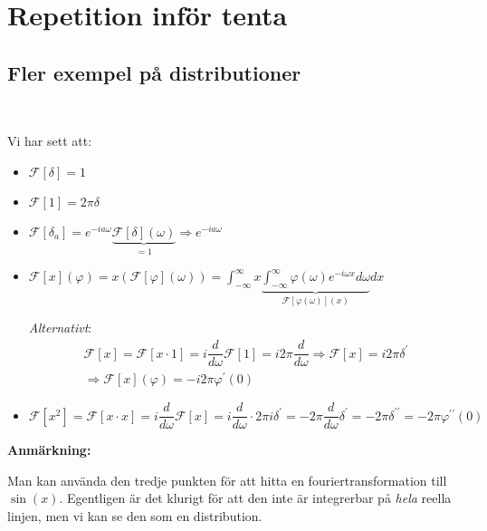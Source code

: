 \section{Repetition inför tenta}
\par\bigskip
\subsection{Fler exempel på distributioner}\hfill\\\par
\noindent Vi har sett att:\par
\begin{itemize}
  \item $\mathcal{F}\left[\delta\right] = 1$
  \item $\mathcal{F}\left[1\right] = 2\pi\delta$
  \item $\mathcal{F}\left[\delta_a\right] = e^{-ia\omega}\underbrace{\mathcal{F}\left[\delta\right](\omega)}_{\text{$=1$}}\Rightarrow e^{-ia\omega}$\par
  \item $\mathcal{F}\left[x\right](\varphi) = x\left(\mathcal{F}\left[\varphi\right](\omega)\right) = \int_{-\infty}^{\infty}x\underbrace{\int_{-\infty}^{\infty}\varphi(\omega)e^{-i\omega x}d\omega}_{\text{$\mathcal{F}\left[\varphi(\omega)\right](x)$}} dx$
    \par\bigskip
    \noindent\textit{Alternativt}:
    \begin{equation*}
      \begin{gathered}
        \mathcal{F}\left[x\right] = \mathcal{F}\left[x\cdot1\right] = i\dfrac{d}{d\omega}\mathcal{F}\left[1\right] = i2\pi\dfrac{d}{d\omega}\Rightarrow \mathcal{F}\left[x\right] = i2\pi\delta^{\prime}\\
        \Rightarrow \mathcal{F}\left[x\right](\varphi) = -i2\pi\varphi^{\prime}(0)
      \end{gathered}
    \end{equation*}\par
  \item $\mathcal{F}\left[x^2\right] = \mathcal{F}\left[x\cdot x\right] = i\dfrac{d}{d\omega}\mathcal{F}\left[x\right] = i\dfrac{d}{d\omega}\cdot2\pi i\delta^{\prime} = -2\pi\dfrac{d}{d\omega}\delta^{\prime} = -2\pi\delta^{\prime\prime} = -2\pi\varphi^{\prime\prime}(0)$
\end{itemize}
\par\bigskip
\noindent\textbf{Anmärkning:}\par
\noindent Man kan använda den tredje punkten för att hitta en fouriertransformation till $\sin(x)$. Egentligen är det klurigt för att den inte är integrerbar på \textit{hela} reella linjen, men vi kan se den som en distribution. 
